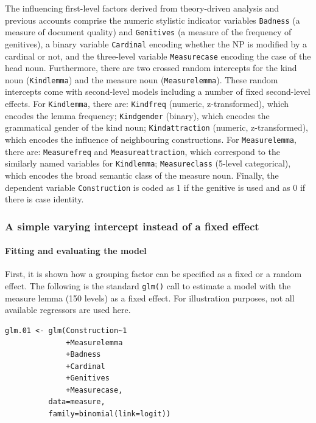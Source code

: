 The influencing first-level factors derived from theory-driven analysis and previous accounts comprise the numeric stylistic indicator variables \texttt{Badness} (a measure of document quality) and \texttt{Genitives} (a measure of the frequency of genitives), a binary variable \texttt{Cardinal} encoding whether the NP is modified by a cardinal or not, and the three-level variable \texttt{Measurecase} encoding the case of the head noun.
Furthermore, there are two crossed random intercepts for the kind noun (\texttt{Kindlemma}) and the measure noun (\texttt{Measurelemma}).
These random intercepts come with second-level models including a number of fixed second-level effects.
For \texttt{Kindlemma}, there are: \texttt{Kindfreq} (numeric, z-transformed), which encodes the lemma frequency; \texttt{Kindgender} (binary), which encodes the grammatical gender of the kind noun; \texttt{Kindattraction} (numeric, z-transformed), which encodes the influence of neighbouring constructions.
For \texttt{Measurelemma}, there are: \texttt{Measurefreq} and \texttt{Measureattraction}, which correspond to the similarly named variables for \texttt{Kindlemma}; \texttt{Measureclass} (5-level categorical), which encodes the broad semantic class of the measure noun.
Finally, the dependent variable \texttt{Construction} is coded as 1 if the genitive is used and as 0 if there is case identity.

\subsubsection{A simple varying intercept instead of a fixed effect}

\paragraph{Fitting and evaluating the model}

First, it is shown how a grouping factor can be specified as a fixed or a random effect.
The following is the standard \texttt{glm()} call to estimate a model with the measure lemma (150 levels) as a fixed effect.
For illustration purposes, not all available regressors are used here.

\vspace{0.5\baselineskip}

\begin{lstlisting}
glm.01 <- glm(Construction~1
              +Measurelemma
              +Badness
              +Cardinal
              +Genitives
              +Measurecase,
	      data=measure,
	      family=binomial(link=logit))
\end{lstlisting}

